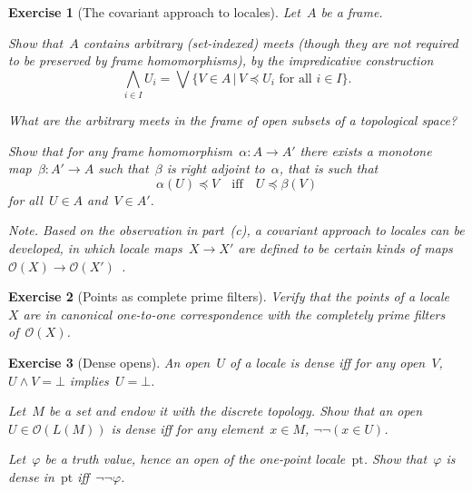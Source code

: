 \documentclass{ws-rv9x6}
\newtheorem{ex}{Exercise}
\newenvironment{exercise}[1]{
  \begin{ex}[#1]
}{\end{ex}}
\renewcommand{\O}{\mathcal{O}}
\renewcommand{\_}{\mathpunct{.}}
\newcommand{\?}{\,{:}\,}
\newcommand{\pt}{\mathrm{pt}}
\begin{document}
\begin{exercise}{The covariant approach to locales}%
Let~$A$ be a frame.
\begin{alphlist}[(c)]
\item Show that~$A$ contains arbitrary (set-indexed) meets (though they are not
required to be preserved by frame homomorphisms), by the impredicative
construction
\[ \bigwedge_{i \in I} U_i = \bigvee\{ V \in A \,|\, \text{$V \preceq U_i$ for all~$i \in I$}
\}. \]
\item What are the arbitrary meets in the frame of open subsets of a
topological space?
\item Show that for any frame homomorphism~$\alpha : A \to A'$ there exists a
monotone map~$\beta : A' \to A$ such that~\emph{$\beta$ is right adjoint
to~$\alpha$}, that is such that
\[ \alpha(U) \preceq V \quad\text{iff}\quad U \preceq \beta(V) \]
for all~$U \in A$ and~$V \in A'$.
\end{alphlist}
{\scriptsize\emph{Note.} Based on the observation in part~(c), a
\emph{covariant approach} to locales can be developed, in which locale maps~$X
\to X'$ are defined to be certain kinds of maps~$\O(X) \to
\O(X')$~\cite{picado-pultr:covariant}.\par}
\end{exercise}

\begin{exercise}{Points as complete prime filters}%
\label{ex:points-as-filters}%
Verify that the points of a locale~$X$ are in canonical one-to-one correspondence
with the completely prime filters of~$\O(X)$.
\end{exercise}

\begin{exercise}{Dense opens}%
\label{ex:dense-opens}%
An open~$U$ of a locale is \emph{dense} iff for any open~$V$, $U \wedge V =
\bot$ implies~$U = \bot$. 
\begin{alphlist}[(b)]
\item Let~$M$ be a set and endow it with the discrete topology. Show that an
open~$U \in \O(L(M))$ is dense iff for any element~$x \in M$, $\neg\neg(x \in
U)$.
\item Let~$\varphi$ be a truth value, hence an open of the one-point
locale~$\pt$. Show that~$\varphi$ is dense in~$\pt$ iff~$\neg\neg\varphi$.
\end{alphlist}
\end{exercise}
\end{document}
